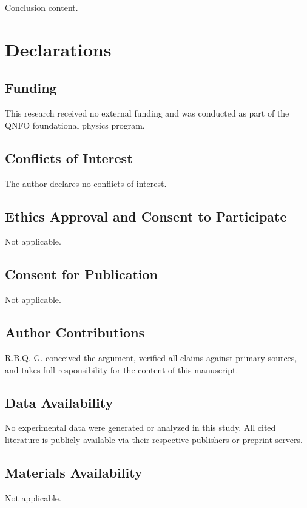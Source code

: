 \documentclass[pdflatex,sn-mathphys-num]{sn-jnl}%
\theoremstyle{thmstyleone}%
\theoremstyle{thmstyletwo}%
\theoremstyle{thmstylethree}%
\begin{document}
Conclusion content.

\section*{Declarations}

\subsection*{Funding}
This research received no external funding and was conducted as part of the QNFO foundational physics program.

\subsection*{Conflicts of Interest}
The author declares no conflicts of interest.

\subsection*{Ethics Approval and Consent to Participate}
Not applicable.

\subsection*{Consent for Publication}
Not applicable.

\subsection*{Author Contributions}
R.B.Q.-G. conceived the argument, verified all claims against primary sources, and takes full responsibility for the content of this manuscript.

\subsection*{Data Availability}
No experimental data were generated or analyzed in this study. All cited literature is publicly available via their respective publishers or preprint servers.

\subsection*{Materials Availability}
Not applicable.
\end{document}
